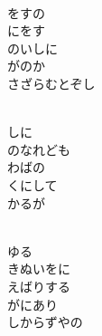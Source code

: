 \documentclass[10pt,b5j]{tarticle} %
\begin{document}
\vspace{1.5em} %
\newcommand{\linespace}{0.5em} %
\newcommand{\blocksize}{0.5\hsize} %
\newcommand{\itemmargin}{3em} %
\begin{enumerate} %
    \setlength{\itemindent}{\itemmargin} %
    \begin{minipage}[c]{\blocksize}
    
        \vspace{\linespace}
        \item~\\
        をすの\\
        にをす\\
        のいしに\\
        がのか\\
        さざらむとぞし
        
    \end{minipage}
    \begin{minipage}[c]{\blocksize}
        
        \vspace{\linespace}
        \item~\\
        しに\\
        のなれども\\
        わばの\\
        くにして\\
        かるが
        
    \end{minipage}
    \begin{minipage}[c]{\blocksize}
        
        \vspace{\linespace}
        \item~\\
        ゆる\\
        きぬいをに\\
        えばりする\\
        がにあり\\
        しからずやの
        

\end{minipage}
\end{enumerate}
\end{document}
